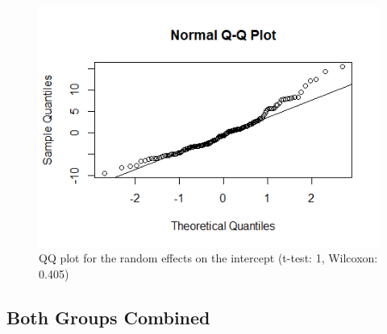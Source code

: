 \begin{figure}[H]
\centering
\includegraphics[width=0.5\linewidth]{../../plots/qq_intercept_treatment.png}
\caption{QQ plot for the random effects on the intercept (t-test: 1, Wilcoxon: 0.405)}
\label{fig:re.control}
\end{figure}
\subsection{Both Groups Combined}

